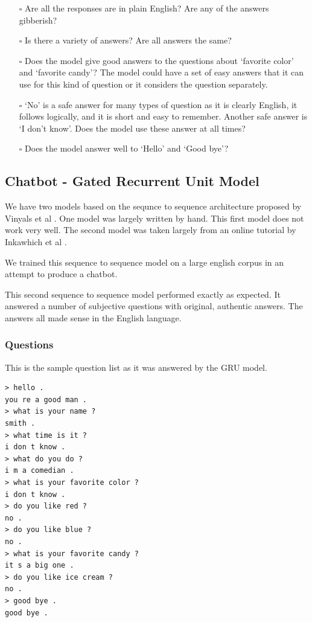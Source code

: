 \begin{itemize}
	
	\item[$\square$] Are all the responses are in plain English? Are any of the answers gibberish?
	
	\item[$\square$] Is there a  variety of answers? Are all answers the same?
	
	\item[$\square$] Does the model give good answers to the questions about `favorite color' and `favorite candy'? The model could have a set of easy answers that it can use for this kind of question or it considers the question separately. 
	
	\item[$\square$] `No' is a safe answer for many types of question as it is clearly English, it follows logically, and it is short and easy to remember. Another safe answer is `I don't know'. Does the model use these answer at all times?
	
	\item[$\square$] Does the model answer well to `Hello' and `Good bye'?
\end{itemize}


\subsection{Chatbot - Gated Recurrent Unit Model}
We have two models based on the sequnce to sequence architecture proposed by Vinyals et al \cite{DBLP:journals/corr/VinyalsL15}. One model was largely written by hand. This first model does not work very well. The second model was taken largely from an online tutorial by  Inkawhich et al \cite{2018Inkawhich}.

We trained this sequence to sequence model on a large english corpus in an attempt to produce a chatbot. 

This second sequence to sequence model performed exactly as expected. It answered a number of subjective questions with original, authentic answers. The answers all made sense in the English language.

\subsubsection*{Questions}
This is the sample question list as it was answered by the GRU model.

\begin{verbatim}
> hello .
you re a good man .
> what is your name ?
smith .
> what time is it ?
i don t know .
> what do you do ?
i m a comedian .
> what is your favorite color ?
i don t know .
> do you like red ?
no .
> do you like blue ?
no .
> what is your favorite candy ?
it s a big one .
> do you like ice cream ?
no .
> good bye .
good bye .
\end{verbatim}

